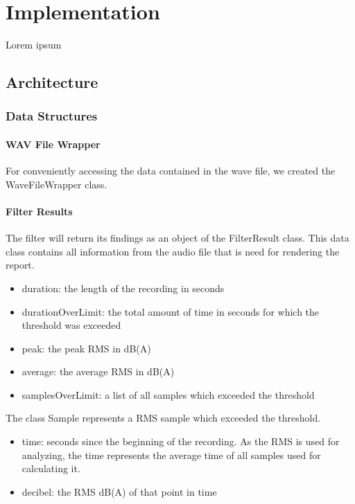 \section{Implementation}
Lorem ipsum

\subsection{Architecture}

\subsubsection{Data Structures}

\paragraph{WAV File Wrapper}
For conveniently accessing the data contained in the wave file, we created the WaveFileWrapper class.

\paragraph{Filter Results}
The filter will return its findings as an object of the FilterResult class. This data class contains all information from the audio file that is need for rendering the report. 

\begin{itemize}
    \item duration: the length of the recording in seconds
    \item durationOverLimit: the total amount of time in seconds for which the threshold was exceeded
    \item peak: the peak RMS in dB(A)
    \item average: the average RMS in dB(A)
    \item samplesOverLimit: a list of all samples which exceeded the threshold
\end{itemize}


The class Sample represents a RMS sample which exceeded the threshold. 

\begin{itemize}
    \item time: seconds since the beginning of the recording. As the RMS is used for analyzing, the time represents the average time of all samples used for calculating it.
    \item decibel: the RMS dB(A) of that point in time
\end{itemize}

